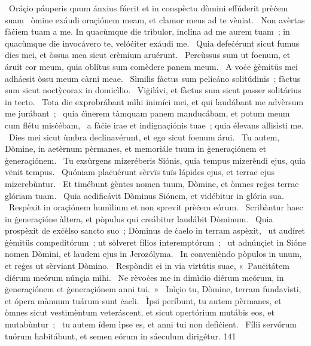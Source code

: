 {~Oráçio páuperis quum ánxius fúerit et in conspèctu dòmini effúderit prèċem suam}
{%
~òmine exáudi oraçiónem meam, et clamor meus ad te vèniat.
~Non avèrtas fàċiem tuam a me. In quacùmque die trìbulor, inclína ad me aurem tuam~; in quacùmque die invocávero te, velóċiter exáudi me.
~Quia defeċérunt sicut fumus dies mei, et òssua mea sicut crèmium aruérunt.
~Percùssus sum ut foenum, et áruit cor meum, quia oblítus sum comèdere panem meum.
~A voċe ġèmitüs mei adháesit òssu meum càrni meae.
~Sìmilis fàctus sum pelicáno solitúdinis~; fàctus sum sicut noctỳcorax in domicìlio.
~Viġilávi, et fàctus sum sicut passer solitárius in tecto.
~Tota die exprobrábant mìhi inimíci mei, et qui laudábant me advèrsum me jurábant~;
~quia ċìnerem tàmquam panem manducábam, et potum meum cum flétu misċébam,
~a fàċie irae et indignaçiónis tuae~; quia élevans allisìsti me.
~Dies mei sicut ùmbra declinavérunt, et ego sicut foenum árui.
~Tu autem, Dòmine, in aetèrnum pèrmanes, et memoriále tuum in ġeneraçiónem et ġeneraçiónem.
~Tu exsùrgens mizeréberis Siónis, quia tempus mizerèndi ejus, quia vënit tempus.
~Quóniam plaċuérunt sèrvïs tuïs lápides ejus, et terrae ejus mizerebùntur.
~Et timébunt ġèntes nomen tuum, Dòmine, et òmnes reġes terrae glóriam tuam.
~Quia aedificávit Dòminus Siónem, et vidébitur in glória sua.
~Respèxit in oraçiónem humìlium et non sprevit prèċem eórum.
~Scribàntur haec in ġeneraçióne àltera, et pòpulus qui creábitur laudábit Dòminum.
~Quia prospèxit de exċèlso sancto suo~; Dòminus de ċaelo in terram aspèxit,
~ut audíret ġèmitüs compeditórum~; ut sòlveret fílios interemptórum~;
~ut adnúnçiet in Sióne nomen Dòmini, et laudem ejus in Jerozólyma.
~In convenièndo pòpulos in unum, et reġes ut sèrviant Dòmino.
~Respòndit ei in via virtútis suae, «~Pauċitátem diérum meórum núnçia mìhi.
~Ne rèvoċes me in dimìdio diérum meórum, in ġeneraçiónem et ġeneraçiónem anni tui.~»
~Inìçio tu, Dòmine, terram fundavìsti, et ópera mànuum tuárum sunt ċaeli.
~Ìpsi períbunt, tu autem pèrmanes, et òmnes sicut vestimèntum veteráscent, et sicut opertórium mutábis eos, et mutabùntur~;
~tu autem ídem ìpse es, et anni tui non defìċient.
~Fílii servórum tuórum habitábunt, et semen eórum in sáeculum dirigétur.
}
{14}{1}
